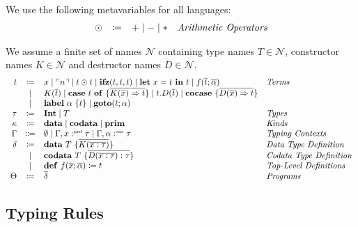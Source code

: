 \begin{definition}
  We use the following metavariables for all languages:
  \[
    \begin{array}{rcll}
      \odot  & \coloneqq & + \mid - \mid * & \emph{Arithmetic Operators}
    \end{array}
  \]
\end{definition}

\begin{definition}
  We assume a finite set of names $\mathcal{N}$ containing type names $T\in\mathcal{N}$, constructor names $K\in\mathcal{N}$ and destructor names $D\in\mathcal{N}$.
  \[ 
    \begin{array}{r c l l}
      t & \coloneqq & x \mid \ulcorner n \urcorner \mid t \odot t \mid \mathbf{ifz}(t, t, t) \mid \mathbf{let}\ x = t\ \mathbf{in}\ t \mid f(\overline{t}; \overline{\alpha}) & \emph{Terms}\\
      & \mid & K(\overline{t}) \mid \mathbf{case}\ t\ \mathbf{of}\ \{ \overline{K(\overline{x}) \Rightarrow t} \} \mid t.D(\overline{t}) \mid \mathbf{cocase}\ \{ \overline{D(\overline{x}) \Rightarrow t} \} & \\
      & \mid & \mathbf{label}\ \alpha\ \{t \} \mid \mathbf{goto}(t; \alpha) & \\
      \tau & \coloneqq & \mathbf{Int} \mid T & \emph{Types} \\
      \kappa & \coloneq & \mathbf{data} \mid \mathbf{codata} \mid \mathbf{prim} & \emph{Kinds} \\
      \Gamma & \Coloneqq & \emptyset \mid \Gamma, x :^{\text{\tiny prd}} \tau \mid \Gamma, \alpha :^{\text{\tiny cns}} \tau & \emph{Typing Contexts} \\
      \delta & \coloneqq & \mathbf{data}\ T\ \{ \overline{K(\overline{x:\tau})} \} & \emph{Data Type Definition}\\
       & \mid & \mathbf{codata}\ T\ \{ \overline{D(\overline{x:\tau}) : \tau}\} & \emph{Codata Type Definition}\\
       & \mid & \mathbf{def}\ f(\overline{x};\overline{\alpha}) \coloneq t & \emph{Top-Level Definitions}\\
      \Theta & \coloneqq & \overline{\delta} & \emph{Programs}\\
    \end{array}
  \]
\end{definition}

\subsection{Typing Rules}
\label{subsec:fun:typing-rules}


